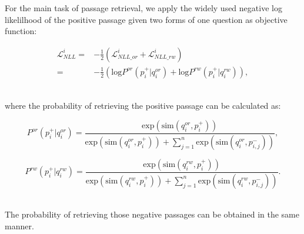 For the main task of passage retrieval, we apply the widely used negative log likelilhood of the positive passage given two forms of one question as objective function:
\begin{small}
\begin{equation}
\begin{aligned}
\mathcal{L}_{NLL}^i 
= & - \frac{1}{2}(\mathcal{L}_{NLL\_or}^i+\mathcal{L}_{NLL\_rw}^i)\\
=&- \frac{1}{2}(\mathrm{log}P^{or}(p_i^+|q_i^{or}) + \mathrm{log}P^{rw}(p_i^+|q_i^{rw})),
\end{aligned}
\end{equation}
\end{small}
\\where the probability of retrieving the positive passage can be calculated as:
\begin{small}
\begin{equation}%
 P^{or}(p_i^+|q_i^{or}) 
 = \frac{\mathrm{exp}(\mathrm{sim}(q_i^{or}, p_i^+))}{\mathrm{exp}(\mathrm{sim}(q_i^{or}, p_i^+))+\sum_{j=1}^n \mathrm{exp}(\mathrm{sim}(q_i^{or}, p_{i,j}^-))},
\end{equation}
\end{small}
\begin{small}
\begin{equation}%
 P^{rw}(p_i^+|q_i^{rw})
 = \frac{\mathrm{exp}(\mathrm{sim}(q_i^{rw}, p_i^+))}{\mathrm{exp}(\mathrm{sim}(q_i^{rw}, p_i^+))+\sum_{j=1}^n \mathrm{exp}(\mathrm{sim}(q_i^{rw}, p_{i,j}^-))}.
\end{equation}
\end{small}
\\The probability of retrieving those negative passages can be obtained in the same manner.


